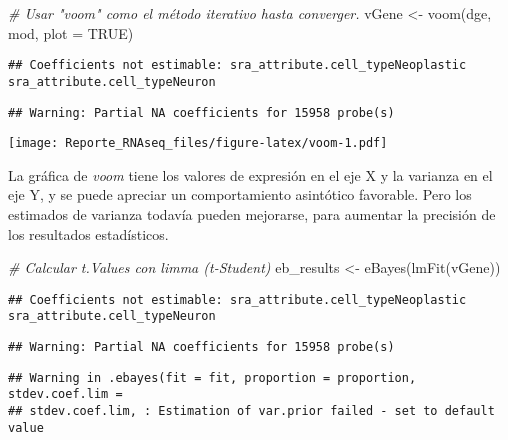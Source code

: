\documentclass[
]{article}
\newenvironment{Shaded}{\begin{snugshade}}{\end{snugshade}}
\newcommand{\AttributeTok}[1]{\textcolor[rgb]{0.77,0.63,0.00}{#1}}
\newcommand{\CommentTok}[1]{\textcolor[rgb]{0.56,0.35,0.01}{\textit{#1}}}
\newcommand{\ConstantTok}[1]{\textcolor[rgb]{0.00,0.00,0.00}{#1}}
\newcommand{\FunctionTok}[1]{\textcolor[rgb]{0.00,0.00,0.00}{#1}}
\newcommand{\NormalTok}[1]{#1}
\newcommand{\OtherTok}[1]{\textcolor[rgb]{0.56,0.35,0.01}{#1}}
\begin{document}
\begin{Shaded}
\begin{Highlighting}[]
\CommentTok{\# Usar "voom" como el método iterativo hasta converger.}
\NormalTok{vGene }\OtherTok{\textless{}{-}} \FunctionTok{voom}\NormalTok{(dge, mod, }\AttributeTok{plot =} \ConstantTok{TRUE}\NormalTok{)}
\end{Highlighting}
\end{Shaded}

\begin{verbatim}
## Coefficients not estimable: sra_attribute.cell_typeNeoplastic sra_attribute.cell_typeNeuron
\end{verbatim}

\begin{verbatim}
## Warning: Partial NA coefficients for 15958 probe(s)
\end{verbatim}

\texttt{[image: Reporte\_RNAseq\_files/figure-latex/voom-1.pdf]}

La gráfica de \emph{voom} tiene los valores de expresión en el eje X y
la varianza en el eje Y, y se puede apreciar un comportamiento
asintótico favorable. Pero los estimados de varianza todavía pueden
mejorarse, para aumentar la precisión de los resultados estadísticos.

\begin{Shaded}
\begin{Highlighting}[]
\CommentTok{\# Calcular t.Values con limma (t{-}Student)}
\NormalTok{eb\_results }\OtherTok{\textless{}{-}} \FunctionTok{eBayes}\NormalTok{(}\FunctionTok{lmFit}\NormalTok{(vGene))}
\end{Highlighting}
\end{Shaded}

\begin{verbatim}
## Coefficients not estimable: sra_attribute.cell_typeNeoplastic sra_attribute.cell_typeNeuron
\end{verbatim}

\begin{verbatim}
## Warning: Partial NA coefficients for 15958 probe(s)
\end{verbatim}

\begin{verbatim}
## Warning in .ebayes(fit = fit, proportion = proportion, stdev.coef.lim =
## stdev.coef.lim, : Estimation of var.prior failed - set to default value
\end{verbatim}
\end{document}

